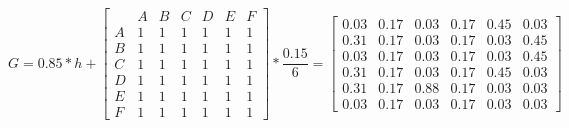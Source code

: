 \[G = 0.85*h + \left[ {\begin{array}{*{20}{c}}
{}&A&B&C&D&E&F\\
A&1&1&1&1&1&1\\
B&1&1&1&1&1&1\\
C&1&1&1&1&1&1\\
D&1&1&1&1&1&1\\
E&1&1&1&1&1&1\\
F&1&1&1&1&1&1
\end{array}} \right]*\frac{{0.15}}{6} = \left[ {\begin{array}{*{20}{c}}
{0.03}&{0.17}&{0.03}&{0.17}&{0.45}&{0.03}\\
{0.31}&{0.17}&{0.03}&{0.17}&{0.03}&{0.45}\\
{0.03}&{0.17}&{0.03}&{0.17}&{0.03}&{0.45}\\
{0.31}&{0.17}&{0.03}&{0.17}&{0.45}&{0.03}\\
{0.31}&{0.17}&{0.88}&{0.17}&{0.03}&{0.03}\\
{0.03}&{0.17}&{0.03}&{0.17}&{0.03}&{0.03}
\end{array}} \right]\]
